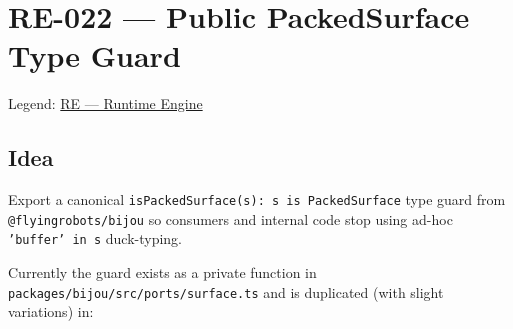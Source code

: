 \chapter{RE-022 --- Public PackedSurface Type Guard}\label{record-374}

\smallskip

Legend: \href{https://github.com/flyingrobots/bijou/blob/cbd70612140e7a450d764b3c7be1c6af878b99bc/docs/method/graveyard/legends/RE-runtime-engine.md}{RE --- Runtime Engine}

\section{Idea}\label{record-374-idea}

Export a canonical \texttt{i\allowbreak{}s\allowbreak{}P\allowbreak{}a\allowbreak{}c\allowbreak{}k\allowbreak{}e\allowbreak{}d\allowbreak{}S\allowbreak{}u\allowbreak{}r\allowbreak{}f\allowbreak{}a\allowbreak{}c\allowbreak{}e\allowbreak{}(\allowbreak{}s\allowbreak{})\allowbreak{}:\allowbreak{} \allowbreak{}s\allowbreak{} \allowbreak{}i\allowbreak{}s\allowbreak{} \allowbreak{}P\allowbreak{}a\allowbreak{}c\allowbreak{}k\allowbreak{}e\allowbreak{}d\allowbreak{}S\allowbreak{}u\allowbreak{}r\allowbreak{}f\allowbreak{}a\allowbreak{}c\allowbreak{}e} type guard from \texttt{@\allowbreak{}f\allowbreak{}l\allowbreak{}y\allowbreak{}i\allowbreak{}n\allowbreak{}g\allowbreak{}r\allowbreak{}o\allowbreak{}b\allowbreak{}o\allowbreak{}t\allowbreak{}s\allowbreak{}/\allowbreak{}b\allowbreak{}i\allowbreak{}j\allowbreak{}o\allowbreak{}u} so consumers and internal code stop using ad-hoc \texttt{'\allowbreak{}b\allowbreak{}u\allowbreak{}f\allowbreak{}f\allowbreak{}e\allowbreak{}r\allowbreak{}'\allowbreak{} \allowbreak{}i\allowbreak{}n\allowbreak{} \allowbreak{}s} duck-typing.

Currently the guard exists as a private function in \texttt{p\allowbreak{}a\allowbreak{}c\allowbreak{}k\allowbreak{}a\allowbreak{}g\allowbreak{}e\allowbreak{}s\allowbreak{}/\allowbreak{}b\allowbreak{}i\allowbreak{}j\allowbreak{}o\allowbreak{}u\allowbreak{}/\allowbreak{}s\allowbreak{}r\allowbreak{}c\allowbreak{}/\allowbreak{}p\allowbreak{}o\allowbreak{}r\allowbreak{}t\allowbreak{}s\allowbreak{}/\allowbreak{}s\allowbreak{}u\allowbreak{}r\allowbreak{}f\allowbreak{}a\allowbreak{}c\allowbreak{}e\allowbreak{}.\allowbreak{}t\allowbreak{}s} and is duplicated (with slight variations) in:

